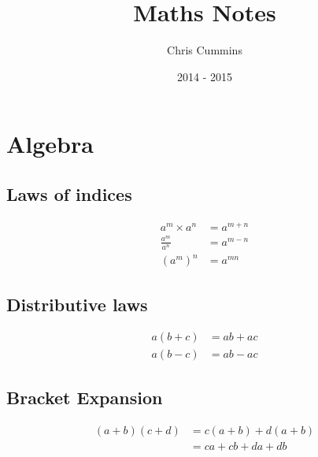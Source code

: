 \title{Maths Notes}
\author{Chris Cummins}
\date{2014 - 2015}



\sectionfont{\large\selectfont}
\subsectionfont{\normalsize\selectfont}


\maketitle
\tableofcontents

\newpage
\section{Algebra}

\subsection{Laws of indices}

\begin{align}
a^m \times a^n &= a^{m+n}\\
\frac{a^m}{a^n} &= a^{m-n}\\
\left(a^m\right)^n &= a^{mn}
\end{align}

\subsection{Distributive laws}

\setcounter{equation}{0}
\begin{align}
a(b + c) &= ab + ac\\
a(b - c) &= ab - ac
\end{align}

\subsection{Bracket Expansion}
\begin{align}
(a+b)(c+d) &= c(a+b) + d(a+b)\\
&= ca + cb + da + db
\end{align}


